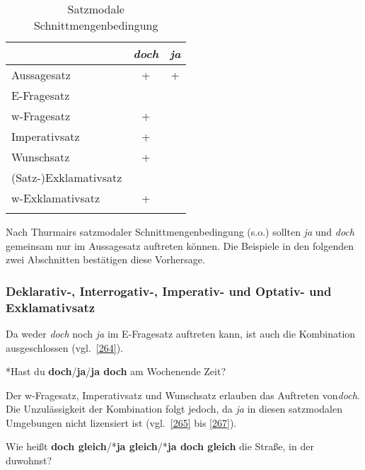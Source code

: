 \begin{table}
     \begin{tabular}[t]{lcc}
     		\lsptoprule
				& \itshape doch & \itshape ja\\\midrule
		Aussagesatz          & + & + \\
     		E-Fragesatz          & \textminus  & \textminus\\
     		w-Fragesatz          &  + & \textminus\\
     		Imperativsatz        & + & \textminus \\ 
     		Wunschsatz           & + & \textminus \\
     		(Satz-)Exklamativsatz& \textminus  & \textminus\\
     		w-Exklamativsatz   & +  & \textminus\\
             \lspbottomrule
      \end{tabular}
      \caption{Satzmodale Schnittmengenbedingung\label{tab:263}}
\end{table}
Nach Thurmairs satzmodaler Schnittmengenbedingung (s.o.) sollten \textit{ja} und \textit{doch} gemeinsam nur im Aussagesatz auftreten können. Die Beispiele in den folgenden zwei Abschnitten bestätigen diese Vorhersage.

\subsubsection{Deklarativ-, Interrogativ-, Imperativ- und Optativ- und Exklamativsatz}
\label{sec:exkl}
Da weder \textit{doch} noch \textit{ja} im E-Fragesatz auftreten kann, ist auch die Kombination ausgeschlossen (vgl.\ \ref{264}).

\begin{exe}
	\ex\label{264} 
	*Hast du \textbf{doch}/\textbf{ja}/\textbf{ja doch} am Wochenende Zeit?
\end{exe}
Der w-Fragesatz, Imperativsatz  und  Wunschsatz  erlauben das Auftreten von\linebreak \textit{doch}. Die Unzulässigkeit der Kombination folgt jedoch, da \textit{ja} in diesen satzmodalen Umgebungen nicht lizensiert ist (vgl.\ \ref{265} bis \ref{267}).
	
\begin{exe}
	\ex\label{265} 
	{\raggedright Wie heißt \textbf{doch gleich}/*\textbf{ja gleich}/*\textbf{ja doch gleich} die Straße, in der du\linebreak wohnst?}
\end{exe}	
	
